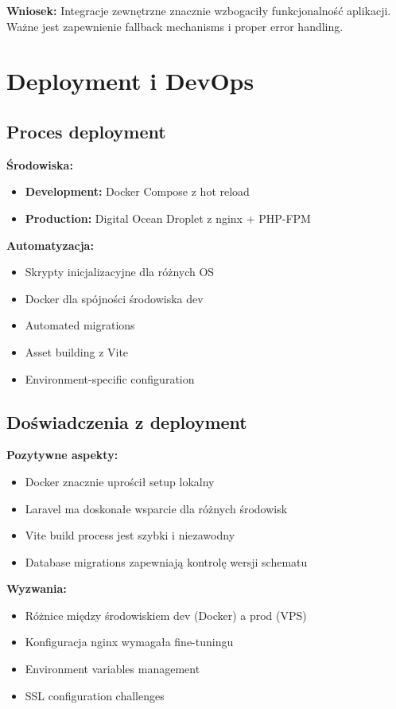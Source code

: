 \documentclass[12pt,a4paper]{article}
\begin{document}
    \textbf{Wniosek:} Integracje zewnętrzne znacznie wzbogaciły funkcjonalność aplikacji. Ważne jest zapewnienie fallback mechanisms i proper error handling.

    \section{Deployment i DevOps}

    \subsection{Proces deployment}

    \textbf{Środowiska:}
    \begin{itemize}
        \item \textbf{Development:} Docker Compose z hot reload
        \item \textbf{Production:} Digital Ocean Droplet z nginx + PHP-FPM
    \end{itemize}

    \textbf{Automatyzacja:}
    \begin{itemize}
        \item Skrypty inicjalizacyjne dla różnych OS
        \item Docker dla spójności środowiska dev
        \item Automated migrations
        \item Asset building z Vite
        \item Environment-specific configuration
    \end{itemize}

    \subsection{Doświadczenia z deployment}

    \textbf{Pozytywne aspekty:}
    \begin{itemize}
        \item Docker znacznie uprościł setup lokalny
        \item Laravel ma doskonałe wsparcie dla różnych środowisk
        \item Vite build process jest szybki i niezawodny
        \item Database migrations zapewniają kontrolę wersji schematu
    \end{itemize}

    \textbf{Wyzwania:}
    \begin{itemize}
        \item Różnice między środowiskiem dev (Docker) a prod (VPS)
        \item Konfiguracja nginx wymagała fine-tuningu
        \item Environment variables management
        \item SSL configuration challenges
    \end{itemize}
\end{document}
